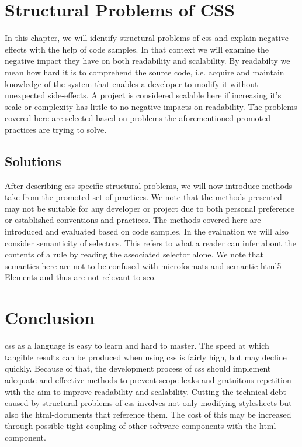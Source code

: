 

\chapter{Structural Problems of CSS}
In this chapter, we will identify structural problems of \gls{css} and explain negative effects with the help of code samples.
In that context we will examine the negative impact they have on both readability and scalability.
By readabilty we mean how hard it is to comprehend the source code, i.e. acquire and maintain knowledge of the system that enables a developer to modify it without unexpected side-effects.
A project is considered scalable here if increasing it's scale or complexity has little to no negative impacts on readability.
The problems covered here are selected based on problems the aforementioned promoted practices are trying to solve.






\section{Solutions}
After describing \gls{css}-specific structural problems, we will now introduce methods take from the promoted set of practices.
We note that the methods presented may not be suitable for any developer or project due to both personal preference or established conventions and practices.
The methods covered here are introduced and evaluated based on code samples.
In the evaluation we will also consider semanticity of selectors.
This refers to what a reader can infer about the contents of a rule by reading the associated selector alone.
We note that semantics here are not to be confused with microformats and semantic \gls{html}5-Elements and thus are not relevant to \gls{seo}.





\chapter{Conclusion}
\gls{css} as a language is easy to learn and hard to master.
The speed at which tangible results can be produced when using \gls{css} is fairly high, but may decline quickly.
Because of that, the development process of \gls{css} should implement adequate and effective methods to prevent scope leaks and gratuitous repetition with the aim to improve readability and scalability.
Cutting the technical debt caused by structural problems of \gls{css} involves not only modifying stylesheets but also the \gls{html}-documents that reference them.
The cost of this may be increased through possible tight coupling of other software components with the \gls{html}-component.

